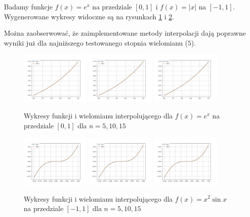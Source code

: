 \documentclass{article}
\begin{document}
Badamy funkcje $f(x) = e^x$ na przedziale $[0,1]$ i $f(x) = |x|$ na $[-1,1]$.
Wygenerowane wykresy widoczne są na rysunkach \ref{5a} i \ref{5b}.

Można zaobserwować, że zaimplementowane metody interpolacji dają poprawne wyniki już dla najniższego testowanego stopnia wielomianu ($5$).

\begin{figure}
\includegraphics[width=0.3\textwidth]{plots/5a_5.png}
\includegraphics[width=0.3\textwidth]{plots/5a_10.png}
\includegraphics[width=0.3\textwidth]{plots/5a_15.png}
\caption{Wykresy funkcji i wielomianu interpolującego dla $f(x) = e^x$ na przedziale $[0,1]$ dla $n=5,10,15$}
\label{5a}
\end{figure}

\begin{figure}
\includegraphics[width=0.3\textwidth]{plots/5b_5.png}
\includegraphics[width=0.3\textwidth]{plots/5b_10.png}
\includegraphics[width=0.3\textwidth]{plots/5b_15.png}
\caption{Wykresy funkcji i wielomianu interpolującego dla $f(x) = x^2\sin x$ na przedziale $[-1,1]$ dla $n=5,10,15$}
\label{5b}
\end{figure}
\end{document}
